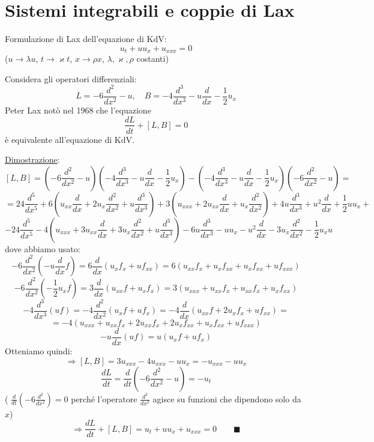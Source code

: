 \documentclass[a4paper,11pt]{report}
\begin{document}
\section{Sistemi integrabili e coppie di Lax}

Formulazione di Lax dell'equazione di KdV:
\[
u_t + u u_x + u_{xxx}=0
\]
($u\to \lambda u$, $t\to \varkappa t$, $x\to \rho x$, $\lambda,\varkappa,\rho$ costanti)

Considera gli operatori differenziali:
\begin{equation}
L=-6\frac{d^2}{dx^2}-u,\quad B=-4\frac{d^3}{dx^3} - u\frac{d}{dx} - \frac{1}{2}u_x
\label{2.186}
\end{equation}
Peter Lax not\`o nel 1968 che l'equazione
\begin{equation}
\frac{dL}{dt} + \left[L,B\right]=0 
\label{2.187}
\end{equation}
\`e equivalente all'equazione di KdV.

\medskip

\underline{Dimostrazione}:
\[
[L,B]=\left(-6\frac{d^2}{dx^2}-u\right)\left(-4\frac{d^3}{dx^3} - u\frac{d}{dx} - \frac{1}{2}u_x\right) - \left(-4\frac{d^3}{dx^3} - u\frac{d}{dx} - \frac{1}{2}u_x\right)\left(-6\frac{d^2}{dx^2}-u\right) = 
\]
\[
= 24\frac{d^5}{dx^5} + 6\left(u_{xx}\frac{d}{dx}+2u_x\frac{d^2}{dx^2} + u\frac{d^3}{dx^3}\right) + 3\left(u_{xxx} + 2u_{xx}\frac{d}{dx}+u_x\frac{d^2}{dx^2}\right) + 4u\frac{d^3}{dx^3} + u^2\frac{d}{dx} + \frac{1}{2}u u_x+ 
\]
\[
- 24\frac{d^5}{dx^5} - 4\left(u_{xxx} + 3u_{xx}\frac{d}{dx} + 3u_x\frac{d^2}{dx^2}+u\frac{d^3}{dx^3}\right) - 6u\frac{d^3}{dx^3} - u u_x - u^2\frac{d}{dx} - 3u_x \frac{d^2}{dx^2} - \frac{1}{2}u_x u
\]
dove abbiamo usato:
\[
-6\frac{d^2}{dx^2}\left(-u\frac{d}{dx}f\right)=6\frac{d}{dx}\left(u_xf_x + u f_{xx}\right)=6\left(u_{xx}f_x + u_xf_{xx} + u_xf_{xx} + uf_{xxx}\right)
\]
\[
-6\frac{d^2}{dx^2}\left(-\frac{1}{2}u_xf\right)=3\frac{d}{dx}\left(u_{xx}f + u_x f_x\right) =3 \left(u_{xxx} + u_{xx}f_x+ u_{xx}f_x+u_xf_{xx}\right)
\]
\[
- 4\frac{d^3}{dx^3} \left(uf\right) = -4\frac{d^2}{dx^2}\left( u_x f + u f_x \right) = -4\frac{d}{dx}\left(u_{xx}f + 2u_x f_x + uf_{xx} \right) = 
\]
\[
=-4\left( u_{xxx} + u_{xx}f_x +2u_{xx}f_x + 2 u_xf_{xx} + u_xf_{xx} + uf_{xxx} \right) 
\]
\[
- u\frac{d}{dx}(uf) = u(u_xf + uf_x)
\]
Otteniamo quindi:
\[
\Rightarrow [L,B] = 3u_{xxx} - 4u_{xxx}-uu_x = -u_{xxx} - u u_x
\]
\[
\frac{dL}{dt}=\frac{d}{dt}\left(-6\frac{d^2}{dx^2} - u\right) = -u_t
\]
( $\frac{d}{dt} (-6\frac{d^2}{dx^2} ) = 0$ perch\'e l'operatore $\frac{d^2}{dx^2}$ agisce su funzioni che dipendono solo da $x$)
\[
\Rightarrow \frac{dL}{dt} + \left[L,B\right] = u_t + u u_x + u_{xxx} = 0 \qquad \blacksquare
\]
\end{document}
